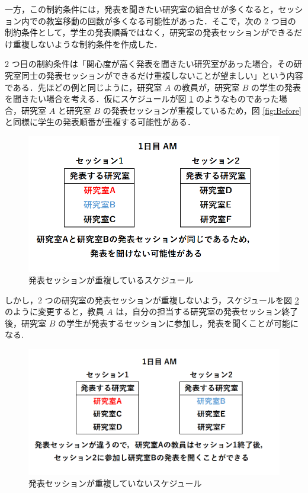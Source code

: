 \documentclass[a4paper,12pt,fleqn]{jarticle}
\begin{document}
一方，この制約条件には，発表を聞きたい研究室の組合せが多くなると，セッション内での教室移動の回数が多くなる可能性があった．そこで，次の $2$ つ目の制約条件として，学生の発表順番ではなく，研究室の発表セッションができるだけ重複しないような制約条件を作成した．

$2$ つ目の制約条件は「関心度が高く発表を聞きたい研究室があった場合，その研究室同士の発表セッションができるだけ重複しないことが望ましい」という内容である．先ほどの例と同じように，研究室 $A$ の教員が，研究室 $B$ の学生の発表を聞きたい場合を考える．仮にスケジュールが図 \ref{fig:befor2} のようなものであった場合，研究室 $A$ と研究室 $B$ の発表セッションが重複しているため，図 \ref{fig:Before} と同様に学生の発表順番が重複する可能性がある．
\begin{figure}[H]
  \begin{center}
    \includegraphics[scale=0.65]{befor2.png}
    \caption{発表セッションが重複しているスケジュール}
    \label{fig:befor2}
  \end{center}
\end{figure}
しかし，$2$ つの研究室の発表セッションが重複しないよう，スケジュールを図 \ref{fig:after2} のように変更すると，教員 $A$ は，自分の担当する研究室の発表セッション終了後，研究室 $B$ の学生が発表するセッションに参加し，発表を聞くことが可能になる.
\begin{figure}[H]
  \begin{center}
    \includegraphics[scale=0.65]{after2.png}
    \caption{発表セッションが重複していないスケジュール}
    \label{fig:after2}
  \end{center}
\end{figure}
\end{document}
